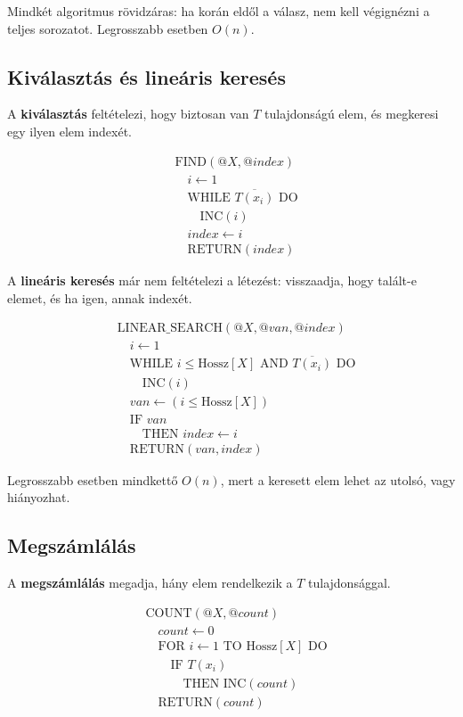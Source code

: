 Mindkét algoritmus rövidzáras: ha korán eldől a válasz, nem kell végignézni a teljes sorozatot. Legrosszabb esetben $O(n)$.

\subsection{Kiválasztás és lineáris keresés}

A \textbf{kiválasztás} feltételezi, hogy biztosan van $T$ tulajdonságú elem, és megkeresi egy ilyen elem indexét.

\[
\begin{aligned}
&\text{FIND}(@X,@index)\\
&\quad i\leftarrow 1\\
&\quad \text{WHILE } \overline{T(x_i)} \text{ DO}\\
&\quad\quad \text{INC}(i)\\
&\quad index\leftarrow i\\
&\quad \text{RETURN}(index)
\end{aligned}
\]

A \textbf{lineáris keresés} már nem feltételezi a létezést: visszaadja, hogy talált-e elemet, és ha igen, annak indexét.

\[
\begin{aligned}
&\text{LINEAR\_SEARCH}(@X,@van,@index)\\
&\quad i\leftarrow 1\\
&\quad \text{WHILE } i\leq \text{Hossz}[X] \text{ AND } \overline{T(x_i)} \text{ DO}\\
&\quad\quad \text{INC}(i)\\
&\quad van\leftarrow (i\leq \text{Hossz}[X])\\
&\quad \text{IF } van\\
&\quad\quad \text{THEN } index\leftarrow i\\
&\quad \text{RETURN}(van,index)
\end{aligned}
\]

Legrosszabb esetben mindkettő $O(n)$, mert a keresett elem lehet az utolsó, vagy hiányozhat.

\subsection{Megszámlálás}

A \textbf{megszámlálás} megadja, hány elem rendelkezik a $T$ tulajdonsággal.

\[
\begin{aligned}
&\text{COUNT}(@X,@count)\\
&\quad count\leftarrow 0\\
&\quad \text{FOR } i\leftarrow 1 \text{ TO Hossz}[X] \text{ DO}\\
&\quad\quad \text{IF } T(x_i)\\
&\quad\quad\quad \text{THEN INC}(count)\\
&\quad \text{RETURN}(count)
\end{aligned}
\]

